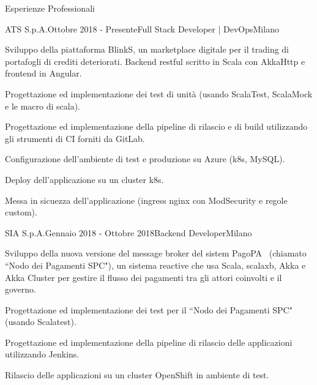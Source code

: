\documentclass{resume} %
\begin{document}

\begin{rSection}{Esperienze Professionali}

\begin{rSubsection}{ATS S.p.A.}{Ottobre 2018 - Presente}{Full Stack Developer | DevOps}{Milano}
\item Sviluppo della piattaforma BlinkS, un marketplace digitale per il trading di portafogli di crediti deteriorati.
Backend restful scritto in Scala con AkkaHttp e frontend in Angular.
\item Progettazione ed implementazione dei test di unit\`a (usando ScalaTest, ScalaMock e le macro di scala).
\item Progettazione ed implementazione della pipeline di rilascio e di build utilizzando gli strumenti di CI forniti da GitLab.
\item Configurazione dell'ambiente di test e produzione su Azure (k8s, MySQL).
\item Deploy dell'applicazione su un cluster k8s.
\item Messa in sicuezza dell'applicazione (ingress nginx con ModSecurity e regole custom).
\end{rSubsection}


\begin{rSubsection}{SIA S.p.A.}{Gennaio 2018 - Ottobre 2018}{Backend Developer}{Milano}
\item Sviluppo della nuova versione del message broker del sistem PagoPA\textregistered~ (chiamato ``Nodo dei Pagamenti SPC"),
un sistema reactive che usa Scala, scalaxb, Akka e Akka Cluster per gestire il flusso dei pagamenti tra gli attori coinvolti e il governo.
\item Progettazione ed implementazione dei test per il ``Nodo dei Pagamenti SPC" (usando Scalatest).
\item Progettazione ed implementazione della pipeline di rilascio delle applicazioni utilizzando Jenkins.
\item Rilascio delle applicazioni su un cluster OpenShift in ambiente di test.
\end{rSubsection}



\end{rSection}
\end{document}
